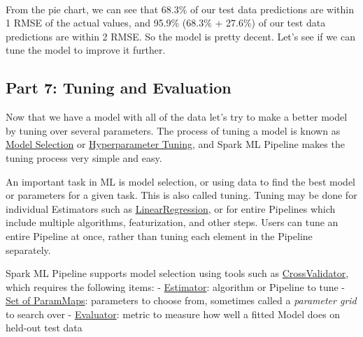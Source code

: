 \documentclass[11pt]{article}
\begin{document}
    \begin{center}
    \end{center}
    { \hspace*{\fill} \\}
    
    From the pie chart, we can see that 68.3\% of our test data predictions
are within 1 RMSE of the actual values, and 95.9\% (68.3\% + 27.6\%) of
our test data predictions are within 2 RMSE. So the model is pretty
decent. Let's see if we can tune the model to improve it further.

    \hypertarget{part-7-tuning-and-evaluation}{%
\subsection{Part 7: Tuning and
Evaluation}\label{part-7-tuning-and-evaluation}}

Now that we have a model with all of the data let's try to make a better
model by tuning over several parameters. The process of tuning a model
is known as
\href{https://spark.apache.org/docs/latest/api/python/reference/pyspark.ml.html?highlight=tuning\#tuning}{Model
Selection} or
\href{https://spark.apache.org/docs/latest/api/python/reference/pyspark.ml.html?highlight=tuning\#tuning}{Hyperparameter
Tuning}, and Spark ML Pipeline makes the tuning process very simple and
easy.

An important task in ML is model selection, or using data to find the
best model or parameters for a given task. This is also called tuning.
Tuning may be done for individual Estimators such as
\href{https://spark.apache.org/docs/latest/api/python/reference/api/pyspark.ml.regression.LinearRegression.html?highlight=linearregression\#pyspark.ml.regression.LinearRegression}{LinearRegression},
or for entire Pipelines which include multiple algorithms,
featurization, and other steps. Users can tune an entire Pipeline at
once, rather than tuning each element in the Pipeline separately.

Spark ML Pipeline supports model selection using tools such as
\href{https://spark.apache.org/docs/latest/api/python/reference/api/pyspark.ml.tuning.CrossValidator.html\#pyspark.ml.tuning.CrossValidator}{CrossValidator},
which requires the following items: -
\href{https://spark.apache.org/docs/latest/api/python/reference/api/pyspark.ml.Estimator.html}{Estimator}:
algorithm or Pipeline to tune -
\href{https://spark.apache.org/docs/latest/api/python/reference/api/pyspark.ml.tuning.ParamGridBuilder.html?highlight=paramgridbuilder\#pyspark.ml.tuning.ParamGridBuilder}{Set
of ParamMaps}: parameters to choose from, sometimes called a
\emph{parameter grid} to search over -
\href{https://spark.apache.org/docs/latest/api/python/reference/api/pyspark.ml.evaluation.Evaluator.html?highlight=evaluator\#pyspark.ml.evaluation.Evaluator}{Evaluator}:
metric to measure how well a fitted Model does on held-out test data
\end{document}
